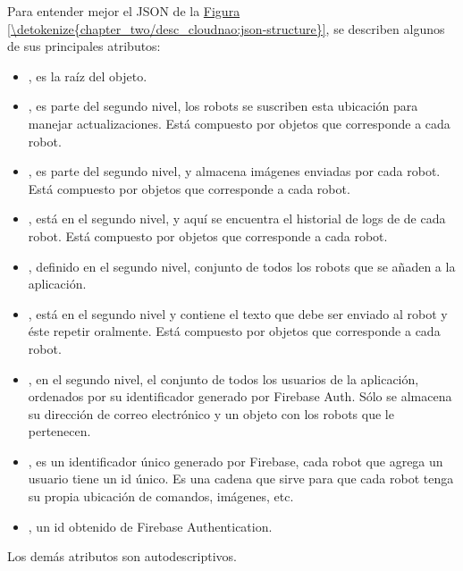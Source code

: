 Para entender mejor el JSON de la \hyperref[\detokenize{chapter_two/desc_cloudnao:json-structure}]{Figura \ref{\detokenize{chapter_two/desc_cloudnao:json-structure}}}, se describen
algunos de sus principales atributos:
\begin{itemize}
\item {} 
, es la raíz del objeto.

\item {} 
, es parte del segundo nivel, los robots se suscriben esta ubicación para manejar actualizaciones. Está compuesto por objetos que corresponde a cada robot.

\item {} 
, es parte del segundo nivel, y almacena imágenes enviadas por cada robot. Está compuesto por objetos que corresponde a cada robot.

\item {} 
, está en el segundo nivel, y aquí se encuentra el historial de logs de  de cada robot. Está compuesto por objetos que corresponde a cada robot.

\item {} 
, definido en el segundo nivel, conjunto de todos los robots que se añaden a la aplicación.

\item {} 
, está en el segundo nivel y contiene el texto que debe ser enviado al robot y éste repetir oralmente. Está compuesto por objetos que corresponde a cada robot.

\item {} 
, en el segundo nivel, el conjunto de todos los usuarios de la aplicación, ordenados por su identificador generado por Firebase Auth. Sólo se almacena su dirección de correo electrónico y un objeto con los robots que le pertenecen.

\item {} 
, es un identificador único generado por Firebase, cada robot que agrega un usuario tiene un id único. Es una cadena que sirve para que cada robot tenga su propia ubicación de comandos, imágenes, etc.

\item {} 
, un id obtenido de Firebase Authentication.

\end{itemize}

Los demás atributos son autodescriptivos.

